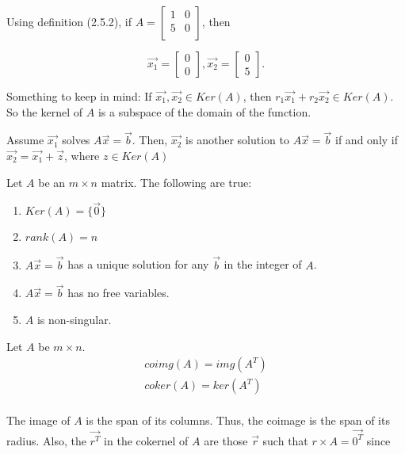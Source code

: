   Using definition (2.5.2), if $A=\left[\begin{smallmatrix}1&0\\5&0\\\end{smallmatrix}\right]$, then 

  \[
    \vec{x_1}=
    \begin{bmatrix}
      0\\0
    \end{bmatrix}
    , 
    \vec{x_2}=
    \begin{bmatrix}
      0\\5
    \end{bmatrix}.
  \]

  Something to keep in mind: If $\vec{x_1},\vec{x_2}\in Ker(A)$, then $r_1\vec{x_1}+r_2\vec{x_2}\in Ker(A)$. So the kernel of $A$ is a subspace of the domain of the function.

  \begin{theorem}
    Assume $\vec{x_1}$ solves $A\vec{x}=\vec{b}$. Then, $\vec{x_2}$ is another solution to $A\vec{x}=\vec{b}$ if and only if $\vec{x_2}=\vec{x_1}+\vec{z}$, where $z\in Ker(A)$
  \end{theorem}

  \begin{prop}
    Let $A$ be an $m\times n$ matrix. The following are true:

    \begin{enumerate}
      \item $Ker(A)=\{\vec{0}\}$
      \item $rank(A)=n$
      \item $A\vec{x}=\vec{b}$ has a unique solution for any $\vec{b}$ in the integer of $A$.
      \item $A\vec{x}=\vec{b}$ has no free variables.
      \item $A$ is non-singular.
    \end{enumerate}
  \end{prop}

  \begin{definition}
    Let $A$ be $m\times n$. 
    \begin{align*}
      coimg(A)=img(A^T)\\
      coker(A)=ker(A^T)\\
    \end{align*}
  \end{definition}

  The image of $A$ is the span of its columns. Thus, the coimage is the span of its radius. Also, the $\vec{r^T}$ in the cokernel of $A$ are those $\vec{r}$ such that $r\times A=\vec{0^T}$ since

